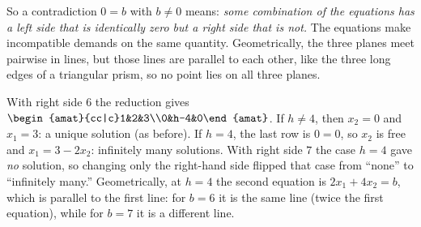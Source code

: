 \documentclass[11pt]{article}
\begin{document}
\begin{description}[leftmargin=0pt,itemsep=5pt]
        So a contradiction $0=b$ with $b\neq0$ means: \emph{some combination of the equations has a
        left side that is identically zero but a right side that is not.} The equations make
        incompatible demands on the same quantity. Geometrically, the three planes meet pairwise
        in lines, but those lines are parallel to each other, like the three long edges of a triangular
        prism, so no point lies on all three planes.
  \item[Pause and think \ref{think:rhs}.] With right side $6$ the reduction gives
        $\begin{amat}{cc|c}1&2&3\\0&h-4&0\end{amat}$.
        If $h\neq4$, then $x_2=0$ and $x_1=3$: a unique solution (as before). If $h=4$, the last row
        is $0=0$, so $x_2$ is free and $x_1=3-2x_2$: infinitely many solutions. With right side $7$ the
        case $h=4$ gave \emph{no} solution, so changing only the right-hand side flipped that case from
        ``none'' to ``infinitely many.'' Geometrically, at $h=4$ the second equation is
        $2x_1+4x_2=b$, which is parallel to the first line: for $b=6$ it is the same line (twice the
        first equation), while for $b=7$ it is a different line.
 

\end{description}
\end{document}
